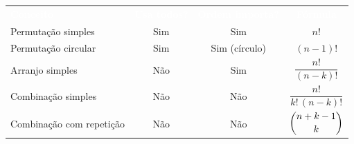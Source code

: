 \documentclass[12pt]{article}
\begin{document}
\vspace{6pt}
\begin{center}
\setlength{\tabcolsep}{14pt}\renewcommand{\arraystretch}{1.6}\small
\begin{tabular}{lccc}
\rowcolor{darkblue}
\textcolor{white}{\textbf{Conceito}} & \textcolor{white}{\textbf{Usa todos?}} &
\textcolor{white}{\textbf{Ordem importa?}} & \textcolor{white}{\textbf{Fórmula}}\\
Permutação simples   & Sim & Sim            & $n!$\\
\rowcolor{exbg}
Permutação circular  & Sim & Sim (círculo)  & $(n-1)!$\\
Arranjo simples      & Não & Sim            & $\dfrac{n!}{(n-k)!}$\\
\rowcolor{exbg}
Combinação simples   & Não & Não            & $\dfrac{n!}{k!\,(n-k)!}$\\
Combinação com repetição & Não & Não        & $\dbinom{n+k-1}{k}$\\
\end{tabular}
\end{center}
\end{document}
